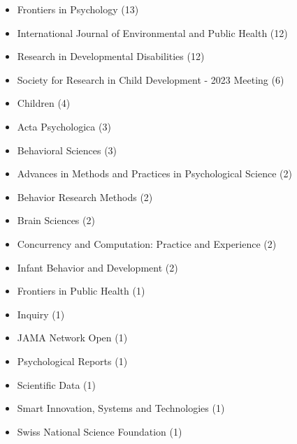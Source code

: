 \documentclass[10pt,a4paper]{altacv}
\begin{document}
\begin{fullwidth}
		\begin{itemize}
			\item Frontiers in Psychology (13)
			\item International Journal of Environmental and Public Health (12)
			\item Research in Developmental Disabilities (12)
			\item Society for Research in Child Development - 2023 Meeting (6)
			\item Children (4)
			\item Acta Psychologica (3)
			\item Behavioral Sciences (3)
			\item Advances in Methods and Practices in Psychological Science (2)
			\item Behavior Research Methods (2)
			\item Brain Sciences (2)
			\item Concurrency and Computation: Practice and Experience (2)
			\item Infant Behavior and Development (2)
			\item Frontiers in Public Health (1)
			\item Inquiry (1)
			\item JAMA Network Open (1)
			\item Psychological Reports (1)
			\item Scientific Data (1)
			\item Smart Innovation, Systems and Technologies (1)
			\item Swiss National Science Foundation (1)
		\end{itemize}
		
		
		

\end{fullwidth}
\end{document}

